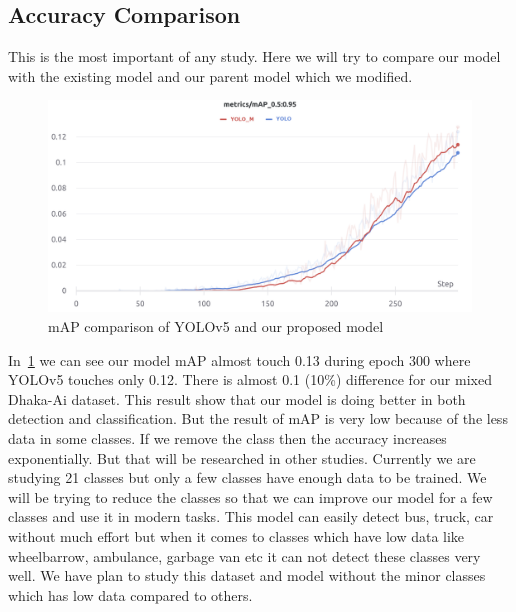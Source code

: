 \subsection{Accuracy Comparison  }
This is the most important of any study. Here we will try to compare our model with the existing model and our parent model which we modified. 

\begin{figure}[h]
    \centering
    \includegraphics[max width=\textwidth]{images/ours/mAP.png}
   \caption[mAP Comparison of YOLOv5 and Our Proposed Model]{mAP comparison of YOLOv5 and our proposed model}
    \label{fig:mAP}
\end{figure}

In~\ref{fig:mAP} we can see our model mAP almost touch 0.13 during epoch 300 where YOLOv5 touches only 0.12. There is almost 0.1 (10\%) difference for our mixed Dhaka-Ai dataset. This result show that our model is doing better in both detection and classification. But the result of mAP is very low because of the less data in some classes. If we remove the class then the accuracy increases exponentially. But that will be researched in other studies. Currently we are studying 21 classes but only a few classes have enough data to be trained. We will be trying to reduce the classes so that we can improve our model for a few classes and use it in modern tasks. This model can easily detect bus, truck, car  without much effort but when it comes to classes which have low data like wheelbarrow, ambulance, garbage van etc it can not detect these classes very well. We have plan to study this dataset and model without the minor classes which has low data compared to others.

